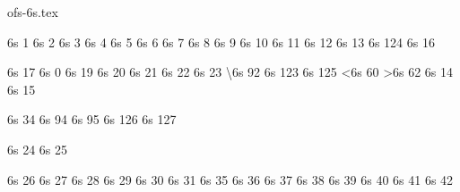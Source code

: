 

\ifx \characterdef \undefined  \fi
\protectreading ofs-6s.tex %

\ifx \characterdef \undefined  \fi



\characterdef \onesuperior    6s  1
\characterdef \twosuperior    6s  2
\characterdef \threesuperior  6s  3
\characterdef \textleq        6s  4
\characterdef \textneq        6s  5
\characterdef \textgeq        6s  6
\characterdef \textpm         6s  7
\characterdef \onequarter     6s  8
\characterdef \onehalf        6s  9
\characterdef \threequarters  6s  10
\characterdef \fraction       6s  11
\characterdef \degree         6s  12
\characterdef \brokenbar      6s  13
\characterdef \fullbar        6s  124
\characterdef \textsum        6s  16

\characterdef \textOmega      6s  17
\characterdef \textminus      6s  0
\characterdef \textmu         6s  19
\characterdef \textDelta      6s  20
\characterdef \textneg        6s  21
\characterdef \textinfty      6s  22
\characterdef \textradical    6s  23
\characterdef \textbackslash  6s  92
\characterdef \textbraceleft  6s  123
\characterdef \textbraceright 6s  125
\characterdef \textless       6s  60
\characterdef \textgreater    6s  62
\characterdef \texttimes      6s  14
\characterdef \textdiv        6s  15

\characterdef \quotedbl       6s  34
\characterdef \asciicircum    6s  94
\characterdef \underscore     6s  95
\characterdef \asciitilde     6s  126
\characterdef \periodcentered 6s  127

\characterdef \ordfeminine    6s  24
\characterdef \ordmasculine   6s  25

\characterdef \vargrave       6s  26
\characterdef \varacute       6s  27
\characterdef \varcaron       6s  28
\characterdef \varcircumflex  6s  29
\characterdef \varbreve       6s  30
\characterdef \varring        6s  31
\characterdef \varmacron      6s  35
\characterdef \vardotaccent   6s  36
\characterdef \varhungarumlaut 6s 37
\characterdef \varogonek      6s  38
\characterdef \varcedilla     6s  39
\characterdef \vartilde       6s  40
\characterdef \vardieresis    6s  41
\characterdef \commaaccent    6s  42

